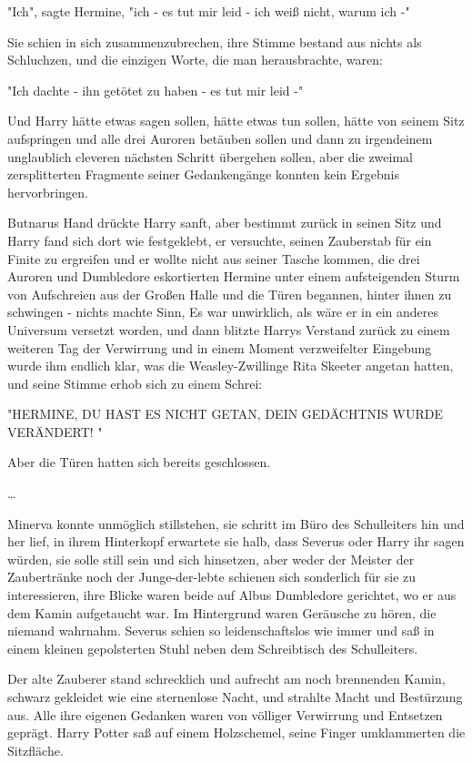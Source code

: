 {"Ich", sagte Hermine, "ich - es tut mir leid - ich weiß nicht, warum ich -"

Sie schien in sich zusammenzubrechen, ihre Stimme bestand aus nichts als Schluchzen, und die einzigen Worte, die man herausbrachte, waren:

"Ich dachte - ihn getötet zu haben - es tut mir leid -"

Und Harry hätte etwas sagen sollen, hätte etwas tun sollen, hätte von seinem Sitz aufspringen und alle drei Auroren betäuben sollen und dann zu irgendeinem unglaublich cleveren nächsten Schritt übergehen sollen, aber die zweimal zersplitterten Fragmente seiner Gedankengänge konnten kein Ergebnis hervorbringen.

Butnarus Hand drückte Harry sanft, aber bestimmt zurück in seinen Sitz und Harry fand sich dort wie festgeklebt, er versuchte, seinen Zauberstab für ein Finite zu ergreifen und er wollte nicht aus seiner Tasche kommen, die drei Auroren und Dumbledore eskortierten Hermine unter einem aufsteigenden Sturm von Aufschreien aus der Großen Halle und die Türen begannen, hinter ihnen zu schwingen - nichts machte Sinn, Es war unwirklich, als wäre er in ein anderes Universum versetzt worden, und dann blitzte Harrys Verstand zurück zu einem weiteren Tag der Verwirrung und in einem Moment verzweifelter Eingebung wurde ihm endlich klar, was die Weasley-Zwillinge Rita Skeeter angetan hatten, und seine Stimme erhob sich zu einem Schrei:

"HERMINE, DU HAST ES NICHT GETAN, DEIN GEDÄCHTNIS WURDE VERÄNDERT! "

Aber die Türen hatten sich bereits geschlossen.

…

Minerva konnte unmöglich stillstehen, sie schritt im Büro des Schulleiters hin und her lief, in ihrem Hinterkopf erwartete sie halb, dass Severus oder Harry ihr sagen würden, sie solle still sein und sich hinsetzen, aber weder der Meister der Zaubertränke noch der Junge-der-lebte schienen sich sonderlich für sie zu interessieren, ihre Blicke waren beide auf Albus Dumbledore gerichtet, wo er aus dem Kamin aufgetaucht war. Im Hintergrund waren Geräusche zu hören, die niemand wahrnahm. Severus schien so leidenschaftslos wie immer und saß in einem kleinen gepolsterten Stuhl neben dem Schreibtisch des Schulleiters.

Der alte Zauberer stand schrecklich und aufrecht am noch brennenden Kamin, schwarz gekleidet wie eine sternenlose Nacht, und strahlte Macht und Bestürzung aus. Alle ihre eigenen Gedanken waren von völliger Verwirrung und Entsetzen geprägt. Harry Potter saß auf einem Holzschemel, seine Finger umklammerten die Sitzfläche.

}
